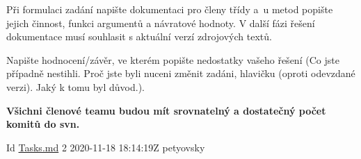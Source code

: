 \begin{DoxyEnumerate}
\item Při formulaci zadání napište dokumentaci pro členy třídy a~u metod popište jejich činnost, funkci argumentů a návratové hodnoty. V další fázi řešení dokumentace musí souhlasit s aktuální verzí zdrojových textů.~\newline
~\newline

\item Napište hodnocení/závěr, ve kterém popište nedostatky vašeho řešení (Co jste případně nestihli. Proč jste byli nuceni změnit zadáni, hlavičku (oproti odevzdané verzi). Jaký k tomu byl důvod.).~\newline
~\newline

\item {\bfseries{Všichni členové teamu budou mít srovnatelný a dostatečný počet komitů do svn.}} ~\newline
~\newline
\begin{DoxyParagraph}{Id}
\mbox{\hyperlink{_tasks_8md}{Tasks.\+md}} 2 2020-\/11-\/18 18\+:14\+:19Z petyovsky 
\end{DoxyParagraph}

\end{DoxyEnumerate}